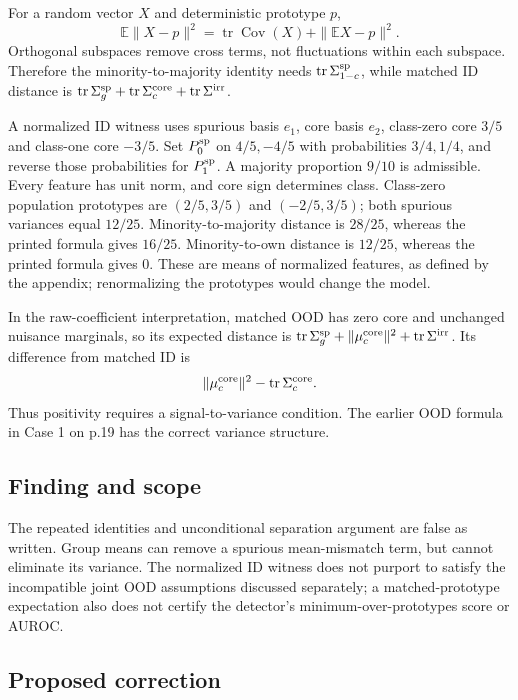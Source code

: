 \documentclass[11pt]{article}
\begin{document}
For a random vector \(X\) and deterministic prototype \(p\), \[\mathbb E\|X-p\|^2=\operatorname{tr}\operatorname{Cov}(X)+\|\mathbb EX-p\|^2.\] Orthogonal subspaces remove cross terms, not fluctuations within each subspace. Therefore the minority-to-majority identity needs \(\operatorname{tr}\Sigma_{1-c}^{\rm sp}\), while matched ID distance is \(\operatorname{tr}\Sigma_g^{\rm sp}+\operatorname{tr}\Sigma_c^{\rm core}+\operatorname{tr}\Sigma^{\rm irr}\).

A normalized ID witness uses spurious basis \(e_1\), core basis \(e_2\), class-zero core \(3/5\) and class-one core \(-3/5\). Set \(P_0^{\rm sp}\) on \(4/5,-4/5\) with probabilities \(3/4,1/4\), and reverse those probabilities for \(P_1^{\rm sp}\). A majority proportion \(9/10\) is admissible. Every feature has unit norm, and core sign determines class. Class-zero population prototypes are \((2/5,3/5)\) and \((-2/5,3/5)\); both spurious variances equal \(12/25\). Minority-to-majority distance is \(28/25\), whereas the printed formula gives \(16/25\). Minority-to-own distance is \(12/25\), whereas the printed formula gives \(0\). These are means of normalized features, as defined by the appendix; renormalizing the prototypes would change the model.

In the raw-coefficient interpretation, matched OOD has zero core and unchanged nuisance marginals, so its expected distance is \(\operatorname{tr}\Sigma_g^{\rm sp}+\|\mu_c^{\rm core}\|^2+\operatorname{tr}\Sigma^{\rm irr}\). Its difference from matched ID is \[\|\mu_c^{\rm core}\|^2-\operatorname{tr}\Sigma_c^{\rm core}.\] Thus positivity requires a signal-to-variance condition. The earlier OOD formula in Case 1 on p.19 has the correct variance structure.

\subsection*{Finding and scope}

The repeated identities and unconditional separation argument are false as written. Group means can remove a spurious mean-mismatch term, but cannot eliminate its variance. The normalized ID witness does not purport to satisfy the incompatible joint OOD assumptions discussed separately; a matched-prototype expectation also does not certify the detector’s minimum-over-prototypes score or AUROC.

\subsection*{Proposed correction}
\end{document}
